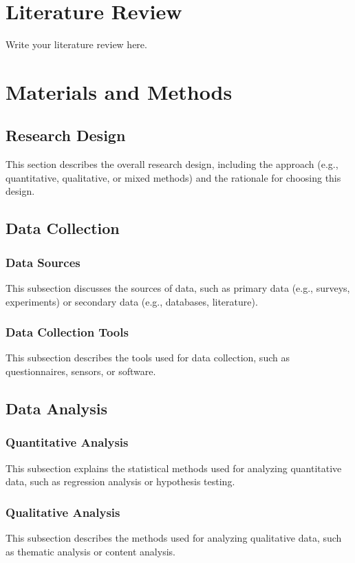 \documentclass[12pt,a4paper]{article}
\begin{document}
\section{Literature Review}
Write your literature review here.

\section{Materials and Methods}
\subsection{Research Design}
This section describes the overall research design, including the approach (e.g., quantitative, qualitative, or mixed methods) and the rationale for choosing this design.

\subsection{Data Collection}
\subsubsection{Data Sources}
This subsection discusses the sources of data, such as primary data (e.g., surveys, experiments) or secondary data (e.g., databases, literature).

\subsubsection{Data Collection Tools}
This subsection describes the tools used for data collection, such as questionnaires, sensors, or software.

\subsection{Data Analysis}
\subsubsection{Quantitative Analysis}
This subsection explains the statistical methods used for analyzing quantitative data, such as regression analysis or hypothesis testing.

\subsubsection{Qualitative Analysis}
This subsection describes the methods used for analyzing qualitative data, such as thematic analysis or content analysis.
\end{document}
